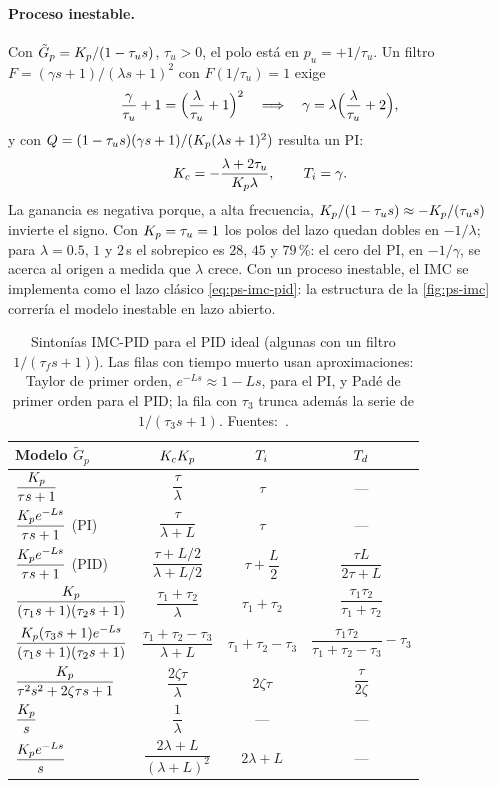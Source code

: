 \paragraph{Proceso inestable.} Con $\tilde G_p=K_p/(1-\tau_u s)$, $\tau_u>0$, el polo está en $p_u=+1/\tau_u$. Un filtro $F=(\gamma s+1)/(\lambda s+1)^2$ con $F(1/\tau_u)=1$ exige
\[
  \frac{\gamma}{\tau_u}+1=\Bigl(\frac{\lambda}{\tau_u}+1\Bigr)^2
  \quad\Longrightarrow\quad
  \gamma=\lambda\Bigl(\frac{\lambda}{\tau_u}+2\Bigr),
\]
y con $Q=(1-\tau_us)(\gamma s+1)/(K_p(\lambda s+1)^2)$ resulta un PI:
\[
  K_c=-\frac{\lambda+2\tau_u}{K_p\lambda},\qquad T_i=\gamma .
\]
La ganancia es negativa porque, a alta frecuencia, $K_p/(1-\tau_us)\approx-K_p/(\tau_us)$ invierte el signo. Con $K_p=\tau_u=1$ los polos del lazo quedan dobles en $-1/\lambda$; para $\lambda=0.5$, $1$ y $2$\,s el sobrepico es $28$, $45$ y $79$\,\%: el cero del PI, en $-1/\gamma$, se acerca al origen a medida que $\lambda$ crece. Con un proceso inestable, el IMC se implementa como el lazo clásico \eqref{eq:ps-imc-pid}: la estructura de la \cref{fig:ps-imc} correría el modelo inestable en lazo abierto.

\begin{table}[ht]
\centering
\caption{Sintonías IMC-PID para el PID ideal (algunas con un filtro $1/(\tau_fs+1)$). Las filas con tiempo muerto usan aproximaciones: Taylor de primer orden, $e^{-Ls}\approx1-Ls$, para el PI, y Padé de primer orden para el PID; la fila con $\tau_3$ trunca además la serie de $1/(\tau_3s+1)$. Fuentes:~\citep{RMS86,Beq03}.}
\label{tab:ps-imc}
\renewcommand{\arraystretch}{1.7}
\begin{tabular}{@{}lccc@{}}
\toprule
Modelo $\tilde G_p$ & $K_cK_p$ & $T_i$ & $T_d$\\
\midrule
$\dfrac{K_p}{\tau s+1}$ & $\dfrac{\tau}{\lambda}$ & $\tau$ & ---\\
$\dfrac{K_p e^{-Ls}}{\tau s+1}$ (PI) & $\dfrac{\tau}{\lambda+L}$ & $\tau$ & ---\\
$\dfrac{K_p e^{-Ls}}{\tau s+1}$ (PID) & $\dfrac{\tau+L/2}{\lambda+L/2}$ & $\tau+\dfrac L2$ & $\dfrac{\tau L}{2\tau+L}$\\
$\dfrac{K_p}{(\tau_1s+1)(\tau_2s+1)}$ & $\dfrac{\tau_1+\tau_2}{\lambda}$ & $\tau_1+\tau_2$ & $\dfrac{\tau_1\tau_2}{\tau_1+\tau_2}$\\
$\dfrac{K_p(\tau_3s+1)e^{-Ls}}{(\tau_1s+1)(\tau_2s+1)}$ & $\dfrac{\tau_1+\tau_2-\tau_3}{\lambda+L}$ & $\tau_1+\tau_2-\tau_3$ & $\dfrac{\tau_1\tau_2}{\tau_1+\tau_2-\tau_3}-\tau_3$\\
$\dfrac{K_p}{\tau^2s^2+2\zeta\tau s+1}$ & $\dfrac{2\zeta\tau}{\lambda}$ & $2\zeta\tau$ & $\dfrac{\tau}{2\zeta}$\\
$\dfrac{K_p}{s}$ & $\dfrac{1}{\lambda}$ & --- & ---\\
$\dfrac{K_p e^{-Ls}}{s}$ & $\dfrac{2\lambda+L}{(\lambda+L)^2}$ & $2\lambda+L$ & ---\\
\bottomrule
\end{tabular}
\end{table}
